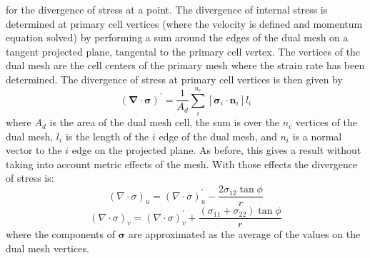 for the divergence of stress at a point.
The divergence of internal stress is determined at primary cell vertices (where the velocity is defined and momentum equation solved) by performing a sum around the edges of the dual mesh on a tangent projected plane, tangental to the primary cell vertex. The vertices of the dual mesh are the cell centers of the primary mesh where the strain rate has been determined. The divergence of stress at primary cell vertices is then given by
\begin{equation}
(\boldsymbol{\nabla} \cdot \boldsymbol{\sigma})^\prime = \frac{1}{A_d} \sum_i^{n_c} \left[ \boldsymbol{\sigma}_i \cdot \boldsymbol{n}_i \right] l_i
\end{equation}
where $A_d$ is the area of the dual mesh cell, the sum is over the $n_c$ vertices of the dual mesh, $l_i$ is the length of the $i$ edge of the dual mesh, and $n_i$ is a normal vector to the $i$ edge on the projected plane. As before, this gives a result without taking into account metric effects of the mesh. With those effects the divergence of stress is:
\begin{equation}
(\nabla \cdot \sigma)_u = (\nabla \cdot \sigma)_u^\prime - \frac{2 \sigma_{12} \tan{\phi}}{r}
\end{equation}
\begin{equation}
(\nabla \cdot \sigma)_v = (\nabla \cdot \sigma)_v^\prime + \frac{(\sigma_{11} + \sigma_{22}) \tan{\phi}}{r}
\end{equation}
where the components of $\boldsymbol{\sigma}$ are approximated as the
average of the values on the dual mesh vertices.
